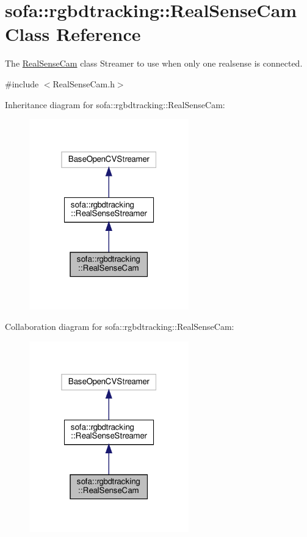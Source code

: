 \hypertarget{classsofa_1_1rgbdtracking_1_1_real_sense_cam}{}\section{sofa\+:\+:rgbdtracking\+:\+:Real\+Sense\+Cam Class Reference}
\label{classsofa_1_1rgbdtracking_1_1_real_sense_cam}


The \hyperlink{classsofa_1_1rgbdtracking_1_1_real_sense_cam}{Real\+Sense\+Cam} class Streamer to use when only one realsense is connected.  




{\ttfamily \#include $<$Real\+Sense\+Cam.\+h$>$}



Inheritance diagram for sofa\+:\+:rgbdtracking\+:\+:Real\+Sense\+Cam\+:\nopagebreak
\begin{figure}[H]
\begin{center}
\leavevmode
\includegraphics[width=196pt]{classsofa_1_1rgbdtracking_1_1_real_sense_cam__inherit__graph}
\end{center}
\end{figure}


Collaboration diagram for sofa\+:\+:rgbdtracking\+:\+:Real\+Sense\+Cam\+:\nopagebreak
\begin{figure}[H]
\begin{center}
\leavevmode
\includegraphics[width=196pt]{classsofa_1_1rgbdtracking_1_1_real_sense_cam__coll__graph}
\end{center}
\end{figure}
